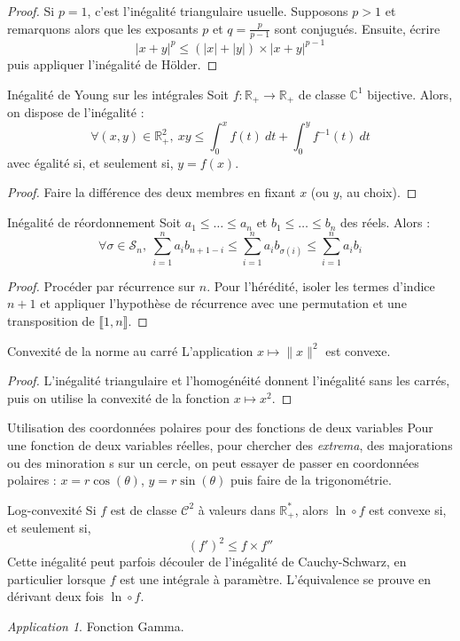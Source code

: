\documentclass[french]{book}
\newcommand{\R}{\mathbb{R}}
\newcommand{\C}{\mathbb{C}}
\newcommand{\st}{^*}
\newcommand{\inv}{^{-1}}
\theoremstyle{plain}
\theoremstyle{definition}
\theoremstyle{remark}
\newtheorem*{app}{Application}
\begin{document}
\begin{proof}
	Si $p=1$, c'est l'inégalité triangulaire usuelle. Supposons $p>1$ et remarquons alors que les exposants $p$ et $q=\displaystyle\frac{p}{p-1}$ sont conjugués. Ensuite, écrire $$\lvert x+y\rvert^p\leqslant(\lvert x\rvert+\lvert y\rvert)\times\lvert x+y\rvert^{p-1}$$ puis appliquer l'inégalité de Hölder.
\end{proof}
\begin{AS}{Inégalité de Young sur les intégrales}
	Soit $f:\R_+\to\R_+$ de classe $\C^1$ bijective. Alors, on dispose de l'inégalité : $$\forall (x,y)\in\R_+^2,\ xy\leqslant\int_{0}^{x}f(t)\ dt+\int_{0}^{y}f\inv(t)\ dt$$ avec égalité si, et seulement si, $y=f(x)$.
\end{AS}
\begin{proof}
	Faire la différence des deux membres en fixant $x$ (ou $y$, au choix).
\end{proof}
\begin{AS}{Inégalité de réordonnement}
	Soit $a_1\leqslant\ldots\leqslant a_n$ et $b_1\leqslant\ldots\leqslant b_n$ des réels. Alors : $$\forall\sigma\in\mathcal{S}_n,\ \sum_{i=1}^{n}a_ib_{n+1-i}\leqslant\sum_{i=1}^{n}a_ib_{\sigma(i)}\leqslant\sum_{i=1}^{n}a_ib_i$$
\end{AS}
\begin{proof}
	Procéder par récurrence sur $n$. Pour l'hérédité, isoler les termes d'indice $n+1$ et appliquer l'hypothèse de récurrence avec une permutation et une transposition de $\llbracket1,n\rrbracket$.
\end{proof}
\begin{AS}{Convexité de la norme au carré} L'application $x\mapsto \lVert x\rVert^2$ est convexe.
\end{AS}
\begin{proof}
	L'inégalité triangulaire et l'homogénéité donnent l'inégalité sans les carrés, puis on utilise la convexité de la fonction $x\mapsto x^2$.
\end{proof}
\begin{AS}{Utilisation des coordonnées polaires pour des fonctions de deux variables} Pour une fonction de deux variables réelles, pour chercher des \textit{extrema}, des majorations ou des minoration	s sur un cercle, on peut essayer de passer en coordonnées polaires : $x = r\cos(\theta)$, $y = r\sin(\theta)$ puis faire de la trigonométrie.
\end{AS}
\begin{AS}{Log-convexité} Si $f$ est de classe $\mathcal{C}^2$ à valeurs dans $\R_+\st$, alors $\ln\circ f$ est convexe si, et seulement si, $$(f')^2\leqslant f\times f''$$ Cette inégalité peut parfois découler de l'inégalité de Cauchy-Schwarz, en particulier lorsque $f$ est une intégrale à paramètre. L'équivalence se prouve en dérivant deux fois $\ln\circ f$.
\end{AS}
\begin{app}
	Fonction Gamma.
\end{app}
\end{document}
